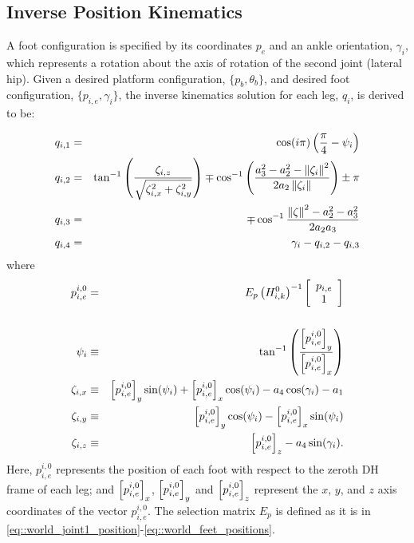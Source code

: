 		\subsection{Inverse Position Kinematics}
			\label{sec::inverse_position_kinematics}
			
			A foot configuration is specified by its coordinates ${p}_{e}$ and an ankle orientation, $\gamma_{i}$,  which represents a rotation about the axis of rotation of the second joint (lateral hip). Given a desired platform configuration, $\{ {p}_{b}, \theta_{b} \}$,  and desired \Ith foot configuration,  $\{ {p}_{i,e} , \gamma_{i} \}$, the inverse kinematics solution for each \Ith leg, ${q}_{i}$, is derived to be:

				\begin{eqnarray}
					q_{i,1} &=& \cos(i\pi) \left( \frac{\pi}{4} - \psi_{i} \right) \nonumber\\
					q_{i,2} &=&	\tan^{-1} \left(\frac{\zeta_{i,z}}{\sqrt{\zeta_{i,x}^2+\zeta_{i,y}^2}}\right) \mp \cos^{-1}\left(\frac{a_{3}^2-a_{2}^2-\left\lVert\zeta_{i}\right\rVert^2}{2 a_{2} \left\lVert\zeta_{i}\right\rVert }\right) \pm \pi 	\nonumber\\
					q_{i,3} &=&	\mp \cos^{-1}\frac{\left\lVert\zeta\right\rVert^2-a_{2}^2-a_{3}^2}{2 a_{2} a_{3}} \nonumber\\
					q_{i,4} &=&	\gamma_{i} - q_{i,2} - q_{i,3}	
				\end{eqnarray}
				where
				\begin{eqnarray}
					{p}_{i,e}^{i,0} &=&
					E_{p} 
					\left( {H}_{i,k}^{0} \right) ^{-1}
					\left[
						\begin{array}{c}
							{p}_{i,e} 		\\
							1 				\\ 	
						\end{array}
					\right]	\nonumber\\																						\nonumber\\
					\psi_{i} 	&\equiv&	\tan^{-1}\left( \frac{\left[{p}_{i,e}^{i,0}\right]_{y}}{\left[{p}_{i,e}^{i,0}\right]_{x} } \right)												\nonumber\\
					\zeta_{i,x} &\equiv& 	\left[{p}_{i,e}^{i,0}\right]_{y} \sin(\psi_{i}) + \left[{p}_{i,e}^{i,0}\right]_{x} \cos(\psi_{i}) - a_{4} \cos(\gamma_{i}) - a_{1} 						\nonumber\\
					\zeta_{i,y} &\equiv& 	\left[{p}_{i,e}^{i,0}\right]_{y} \cos(\psi_{i}) - \left[{p}_{i,e}^{i,0}\right]_{x} \sin(\psi_{i}) 											\nonumber\\
					\zeta_{i,z}	&\equiv&  	\left[{p}_{i,e}^{i,0}\right]_{z} - a_{4} \sin(\gamma_{i}) .
				\end{eqnarray}
			Here, ${p}_{i,e}^{i,0}$ represents the position of each \Ith foot with respect to the zeroth DH frame of each \Ith leg; and $\left[{p}_{i,e}^{i,0}\right]_{x}$, $\left[{p}_{i,e}^{i,0}\right]_{y}$ and $\left[{p}_{i,e}^{i,0}\right]_{z}$ represent the $x$, $y$, and $z$ axis coordinates of the vector ${p}_{i,e}^{i,0}$. The selection matrix $E_{p}$ is defined as it is in \ref{eq::world_joint1_position}-\ref{eq::world_feet_positions}.


